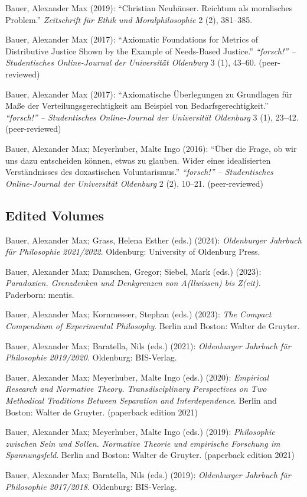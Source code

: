 \documentclass[a4paper,10pt]{article}
\newenvironment{literature}{%
   \parskip6pt\parindent0pt\raggedright
   \def\lititem{\hangindent=1cm\hangafter1}}{%
   \par\ignorespaces}
\begin{document}
\begin{literature}
\lititem Bauer, Alexander Max (2019): \enquote{Christian Neuhäuser. Reichtum als moralisches Problem.} \textit{Zeitschrift für Ethik und Moralphilosophie} 2 (2), 381--385.

\lititem Bauer, Alexander Max (2017): \enquote{Axiomatic Foundations for Metrics of Distributive Justice Shown by the Example of Needs-Based Justice.} \textit{\enquote{forsch!} -- Studentisches Online-Journal der Universität Oldenburg} 3 (1), 43--60. (peer-reviewed)

\lititem Bauer, Alexander Max (2017): \enquote{Axiomatische Überlegungen zu Grundlagen für Maße der Verteilungsgerechtigkeit am Beispiel von Bedarfsgerechtigkeit.} \textit{\enquote{forsch!} -- Studentisches Online-Journal der Universität Oldenburg} 3 (1), 23--42. (peer-reviewed)

\lititem Bauer, Alexander Max; Meyerhuber, Malte Ingo (2016): \enquote{Über die Frage, ob wir uns dazu entscheiden können, etwas zu glauben. Wider eines idealisierten Verständnisses des doxastischen Voluntarismus.} \textit{\enquote{forsch!} -- Studentisches Online-Journal der Universität Oldenburg} 2 (2), 10--21. (peer-reviewed)
\end{literature}


\subsection*{Edited Volumes}
\begin{literature}
\lititem Bauer, Alexander Max; Grass, Helena Esther (eds.) (2024): \textit{Oldenburger Jahrbuch für Philosophie 2021/2022}. Oldenburg: University of Oldenburg Press.

\lititem Bauer, Alexander Max; Damschen, Gregor; Siebel, Mark (eds.) (2023): \textit{Paradoxien. Grenzdenken und Denkgrenzen von A(llwissen) bis Z(eit)}. Paderborn: mentis.

\lititem Bauer, Alexander Max; Kornmesser, Stephan (eds.) (2023): \textit{The Compact Compendium of Experimental Philosophy}. Berlin and Boston: Walter de Gruyter.

\lititem Bauer, Alexander Max; Baratella, Nils (eds.) (2021): \textit{Oldenburger Jahrbuch für Philosophie 2019/2020}. Oldenburg: BIS-Verlag.

\lititem Bauer, Alexander Max; Meyerhuber, Malte Ingo (eds.) (2020): \textit{Empirical Research and Normative Theory. Transdisciplinary Perspectives on Two Methodical Traditions Between Separation and Interdependence}. Berlin and Boston: Walter de Gruyter. (paperback edition 2021)

\lititem Bauer, Alexander Max; Meyerhuber, Malte Ingo (eds.) (2019): \textit{Philosophie zwischen Sein und Sollen. Normative Theorie und empirische Forschung im Spannungsfeld}. Berlin and Boston: Walter de Gruyter. (paperback edition 2021)

\lititem Bauer, Alexander Max; Baratella, Nils (eds.) (2019): \textit{Oldenburger Jahrbuch für Philosophie 2017/2018}. Oldenburg: BIS-Verlag.
\end{literature}
\end{document}

